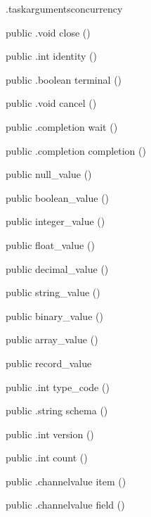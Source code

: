 \begin{CrexxClass}{.taskarguments}{concurrency}
\begin{Members}
    \Method
      {public}
      {.void}
      {close}
      {()}

    \Method
      {public}
      {.int}
      {identity}
      {()}

    \Method
      {public}
      {.boolean}
      {terminal}
      {()}

    \Method
      {public}
      {.void}
      {cancel}
      {()}

    \Method
      {public}
      {.completion}
      {wait}
      {()}

    \Method
      {public}
      {.completion}
      {completion}
      {()}

    \Factory
      {public}
      {null\_value}
      {()}

    \Factory
      {public}
      {boolean\_value}
      {()}

    \Factory
      {public}
      {integer\_value}
      {()}

    \Factory
      {public}
      {float\_value}
      {()}

    \Factory
      {public}
      {decimal\_value}
      {()}

    \Factory
      {public}
      {string\_value}
      {()}

    \Factory
      {public}
      {binary\_value}
      {()}

    \Factory
      {public}
      {array\_value}
      {()}

    \Factory
      {public}
      {record\_value}
      {}

    \Method
      {public}
      {.int}
      {type\_code}
      {()}

    \Method
      {public}
      {.string}
      {schema}
      {()}

    \Method
      {public}
      {.int}
      {version}
      {()}

    \Method
      {public}
      {.int}
      {count}
      {()}

    \Method
      {public}
      {.channelvalue}
      {item}
      {()}

    \Method
      {public}
      {.channelvalue}
      {field}
      {()}


\end{Members}
\end{CrexxClass}

